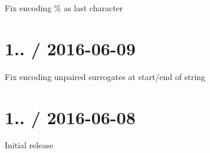
\begin{DoxyItemize}
\item Fix encoding {\ttfamily \%} as last character
\end{DoxyItemize}

\section*{1.. / 2016-\/06-\/09 }


\begin{DoxyItemize}
\item Fix encoding unpaired surrogates at start/end of string
\end{DoxyItemize}

\section*{1.. / 2016-\/06-\/08 }


\begin{DoxyItemize}
\item Initial release 
\end{DoxyItemize}